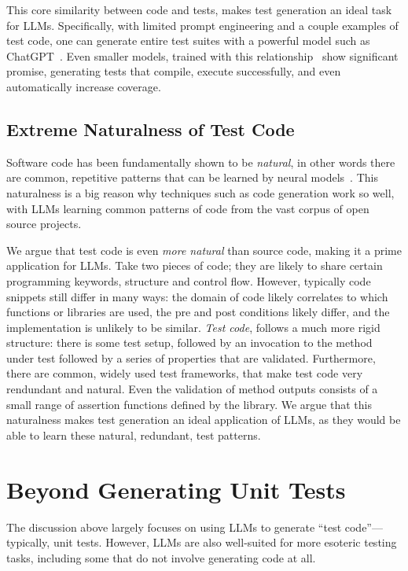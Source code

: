 \documentclass[sigconf,natbib=false]{acmart}
\begin{document}
This core similarity between code and tests, makes test generation an ideal task for LLMs. Specifically, with limited prompt engineering and 
a couple examples of test code, one can generate entire test suites with a powerful model such as ChatGPT~\cite{gpttestgen, siddiq2023empirical}. 
Even smaller models, trained with this relationship~\cite{catlm, starcoder} show significant promise, generating tests that compile, execute successfully, and 
even automatically increase coverage.

\subsection{Extreme Naturalness of Test Code}

Software code has been fundamentally shown to be \emph{natural}, in other words there are common, repetitive patterns that can be 
learned by neural models~\cite{naturalnessofcode}. This naturalness is a big reason why techniques such as code generation work so well, with LLMs 
learning common patterns of code from the vast corpus of open source projects. 

We argue that test code is even \emph{more natural} than source code, making it a prime application for LLMs. Take two pieces of code; they are likely 
to share certain programming keywords, structure and control flow. However, typically code snippets still differ in many ways: the domain of code 
likely correlates to which functions or libraries are used, the pre and post conditions likely differ, and the implementation is unlikely to be similar.
\emph{Test code}, follows a much more rigid structure: there is some test setup, followed by an invocation to the method under test followed by a series of 
properties that are validated. Furthermore, there are common, widely used test frameworks, that make test code very rendundant and natural. Even the validation of 
method outputs consists of a small range of assertion functions defined by the library. We argue that this naturalness makes test generation an ideal application 
of LLMs, as they would be able to learn these natural, redundant, test patterns. 

\section{Beyond Generating Unit Tests}

The discussion above largely focuses on using LLMs to generate ``test
code''---typically, unit tests.  However, LLMs are also well-suited
for more esoteric testing tasks, including some that do not involve
generating code at all.
\end{document}
